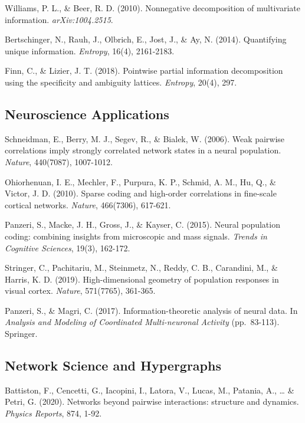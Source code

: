 \documentclass[
  11pt,
  letterpaper,
  oneside,
  openany]{book}
\begin{document}
\label{refs-pid}
Williams, P. L., \& Beer, R. D. (2010). Nonnegative decomposition of
multivariate information. \emph{arXiv:1004.2515}.

Bertschinger, N., Rauh, J., Olbrich, E., Jost, J., \& Ay, N. (2014).
Quantifying unique information. \emph{Entropy}, 16(4), 2161-2183.

Finn, C., \& Lizier, J. T. (2018). Pointwise partial information
decomposition using the specificity and ambiguity lattices.
\emph{Entropy}, 20(4), 297.

\subsection*{Neuroscience Applications}\label{neuroscience-applications}

\label{refs-neuro}
Schneidman, E., Berry, M. J., Segev, R., \& Bialek, W. (2006). Weak
pairwise correlations imply strongly correlated network states in a
neural population. \emph{Nature}, 440(7087), 1007-1012.

Ohiorhenuan, I. E., Mechler, F., Purpura, K. P., Schmid, A. M., Hu, Q.,
\& Victor, J. D. (2010). Sparse coding and high-order correlations in
fine-scale cortical networks. \emph{Nature}, 466(7306), 617-621.

Panzeri, S., Macke, J. H., Gross, J., \& Kayser, C. (2015). Neural
population coding: combining insights from microscopic and mass signals.
\emph{Trends in Cognitive Sciences}, 19(3), 162-172.

Stringer, C., Pachitariu, M., Steinmetz, N., Reddy, C. B., Carandini,
M., \& Harris, K. D. (2019). High-dimensional geometry of population
responses in visual cortex. \emph{Nature}, 571(7765), 361-365.

Panzeri, S., \& Magri, C. (2017). Information-theoretic analysis of
neural data. In \emph{Analysis and Modeling of Coordinated
Multi-neuronal Activity} (pp.~83-113). Springer.

\subsection*{Network Science and
Hypergraphs}\label{network-science-and-hypergraphs}

\label{refs-networks}
Battiston, F., Cencetti, G., Iacopini, I., Latora, V., Lucas, M.,
Patania, A., \ldots{} \& Petri, G. (2020). Networks beyond pairwise
interactions: structure and dynamics. \emph{Physics Reports}, 874, 1-92.
\end{document}
